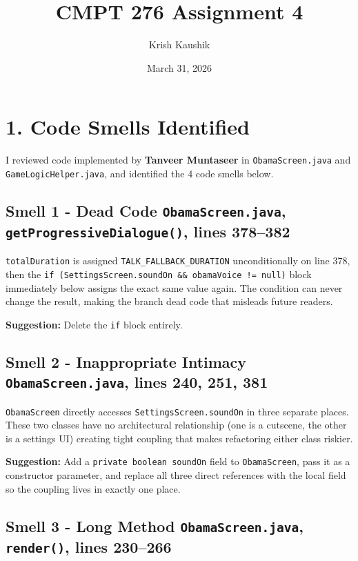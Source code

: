 \documentclass[10pt]{article}
\title{CMPT 276 Assignment 4}
\author{Krish Kaushik}
\date{March 31, 2026}
\begin{document}
\maketitle


\section*{1. Code Smells Identified}

I reviewed code implemented by \textbf{Tanveer Muntaseer} in \texttt{ObamaScreen.java} and \texttt{GameLogicHelper.java}, and identified the 4 code smells below.


\subsection*{Smell 1 - Dead Code \quad \normalfont\texttt{ObamaScreen.java}, \texttt{getProgressiveDialogue()}, lines 378--382}

\texttt{totalDuration} is assigned \texttt{TALK\_FALLBACK\_DURATION} unconditionally on line 378, then the \texttt{if (SettingsScreen.soundOn \&\& obamaVoice != null)} block immediately below assigns the exact same value again. The condition can never change the result, making the branch dead code that misleads future readers.

\textbf{Suggestion:} Delete the \texttt{if} block entirely.

\subsection*{Smell 2 - Inappropriate Intimacy \quad \normalfont\texttt{ObamaScreen.java}, lines 240, 251, 381}

\texttt{ObamaScreen} directly accesses \texttt{SettingsScreen.soundOn} in three separate places. These two classes have no architectural relationship (one is a cutscene, the other is a settings UI) creating tight coupling that makes refactoring either class riskier.

\textbf{Suggestion:} Add a \texttt{private boolean soundOn} field to \texttt{ObamaScreen}, pass it as a constructor parameter, and replace all three direct references with the local field so the coupling lives in exactly one place.

\subsection*{Smell 3 - Long Method \quad \normalfont\texttt{ObamaScreen.java}, \texttt{render()}, lines 230--266}
\end{document}
